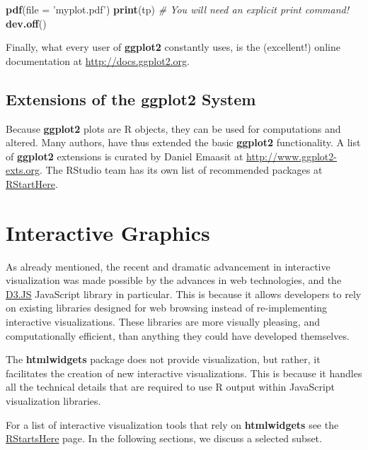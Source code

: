 \documentclass[]{book}
\newenvironment{Shaded}{\begin{snugshade}}{\end{snugshade}}
\newcommand{\KeywordTok}[1]{\textcolor[rgb]{0.13,0.29,0.53}{\textbf{#1}}}
\newcommand{\DataTypeTok}[1]{\textcolor[rgb]{0.13,0.29,0.53}{#1}}
\newcommand{\StringTok}[1]{\textcolor[rgb]{0.31,0.60,0.02}{#1}}
\newcommand{\CommentTok}[1]{\textcolor[rgb]{0.56,0.35,0.01}{\textit{#1}}}
\newcommand{\NormalTok}[1]{#1}
\theoremstyle{definition}
\theoremstyle{definition}
\theoremstyle{definition}
\theoremstyle{remark}
\begin{document}
\begin{Shaded}
\begin{Highlighting}[]
\KeywordTok{pdf}\NormalTok{(}\DataTypeTok{file =} \StringTok{'myplot.pdf'}\NormalTok{)}
\KeywordTok{print}\NormalTok{(tp) }\CommentTok{# You will need an explicit print command!}
\KeywordTok{dev.off}\NormalTok{()}
\end{Highlighting}
\end{Shaded}

Finally, what every user of \textbf{ggplot2} constantly uses, is the
(excellent!) online documentation at \url{http://docs.ggplot2.org}.

\subsection{Extensions of the ggplot2
System}\label{extensions-of-the-ggplot2-system}

Because \textbf{ggplot2} plots are R objects, they can be used for
computations and altered. Many authors, have thus extended the basic
\textbf{ggplot2} functionality. A list of \textbf{ggplot2} extensions is
curated by Daniel Emaasit at
\href{http://www.ggplot2-exts.org/gallery/}{http://www.ggplot2-exts.org}.
The RStudio team has its own list of recommended packages at
\href{https://github.com/rstudio/RStartHere}{RStartHere}.

\section{Interactive Graphics}\label{interactive-graphics}

As already mentioned, the recent and dramatic advancement in interactive
visualization was made possible by the advances in web technologies, and
the \href{https://d3js.org/}{D3.JS} JavaScript library in particular.
This is because it allows developers to rely on existing libraries
designed for web browsing instead of re-implementing interactive
visualizations. These libraries are more visually pleasing, and
computationally efficient, than anything they could have developed
themselves.

The \textbf{htmlwidgets} package does not provide visualization, but
rather, it facilitates the creation of new interactive visualizations.
This is because it handles all the technical details that are required
to use R output within JavaScript visualization libraries.

For a list of interactive visualization tools that rely on
\textbf{htmlwidgets} see the
\href{https://github.com/rstudio/RStartHere}{RStartsHere} page. In the
following sections, we discuss a selected subset.
\end{document}
